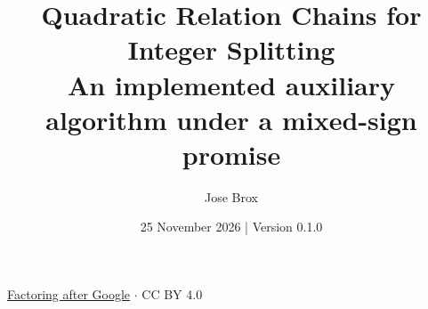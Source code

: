 
\title{Quadratic Relation Chains for Integer Splitting\\[0.4em]\large An implemented auxiliary algorithm under a mixed-sign promise}
\renewcommand{\paperrunningtitle}{Quadratic relation chains}
\author{Jose Brox}
\date{25 November 2026 \quad | \quad Version 0.1.0}

\maketitle
\begin{center}\small\href{https://github.com/JoseBrox/Factoring_after_Google}{Factoring after Google} $\cdot$ CC BY 4.0\end{center}

\clearpage



